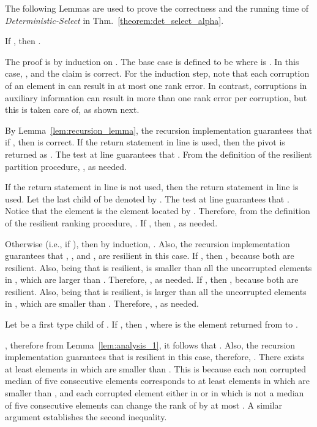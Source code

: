 \documentclass{llncs}
\begin{document}
The following Lemmas are used to prove the correctness and the running time of \emph{Deterministic-Select} in Thm.~\ref{theorem:det_select_alpha}.




\begin{lemma}
\label{lem:analysis_1}
If , then .
\end{lemma}

\begin{pf}
The proof is by induction on . The base case is defined to be where  is . In this case, , and the claim is correct. For the induction step, note that each corruption of an element in  can result in at most one rank error. In contrast, corruptions in auxiliary information can result in more than one rank error per corruption, but this is taken care of, as shown next.

By Lemma~\ref{lem:recursion_lemma}, the recursion implementation guarantees that if , then  is correct. If the return statement in line  is used, then the pivot  is returned as . The test at line  guarantees that . From the definition of the resilient partition procedure, , as needed.

If the return statement in line  is not used, then the return statement in line  is used. Let the last child of  be denoted by . The test at line  guarantees that . Notice that the element  is the element located by . Therefore, from the definition of the resilient ranking procedure, . If , then , as needed.

Otherwise (i.e., if ), then by induction, . Also, the recursion implementation guarantees that , , and , are resilient in this case. If , then , because both are resilient. Also, being that  is resilient,  is smaller than all the uncorrupted elements in , which are larger than . Therefore, , as needed. If , then , because both are resilient. Also, being that  is resilient,  is larger than all the uncorrupted elements in , which are smaller than . Therefore, , as needed.
\end{pf}

\begin{lemma}
\label{lem:analysis_2}
Let  be a first type child of . If , then , where  is the element returned from  to .
\end{lemma}

\begin{pf}
, therefore from Lemma~\ref{lem:analysis_1}, it follows that . Also, the recursion implementation guarantees that  is resilient in this case, therefore, . There exists at least  elements in  which are smaller than . This is because each non corrupted median of five consecutive elements corresponds to at least  elements in  which are smaller than , and each corrupted element either in  or in  which is not a median of five consecutive elements can change the rank of  by at most . A similar argument establishes the second inequality.
\end{pf}
\end{document}
